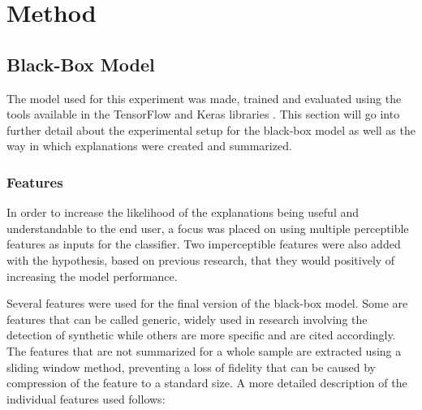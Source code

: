\documentclass{article}
\begin{document}
	\section{Method}
		\subsection{Black-Box Model}
		The model used for this experiment was made, trained and evaluated using the tools
		available in the TensorFlow and Keras libraries \cite{tensorflow2015-whitepaper}. This
		section will go into further detail about the experimental setup for the black-box model
		as well as the way in which explanations were created and summarized.
			\subsubsection{Features}
			In order to increase the likelihood of the explanations being useful and
			understandable to the end user, a focus was placed on using multiple perceptible
			features as inputs for the classifier. Two imperceptible features were also added with
			the hypothesis, based on previous research, that they would positively of increasing
			the model performance.
			\par
			Several features were used for the final version of the black-box model. Some are
			features that can be called generic, widely used in research involving the detection
			of synthetic while others are more specific and are cited accordingly. The features
			that are not summarized for a whole sample are extracted using a sliding window method,
			preventing a loss of fidelity that can be caused by compression of the feature to a
			standard size. A more detailed description of the individual features used follows:
\end{document}
